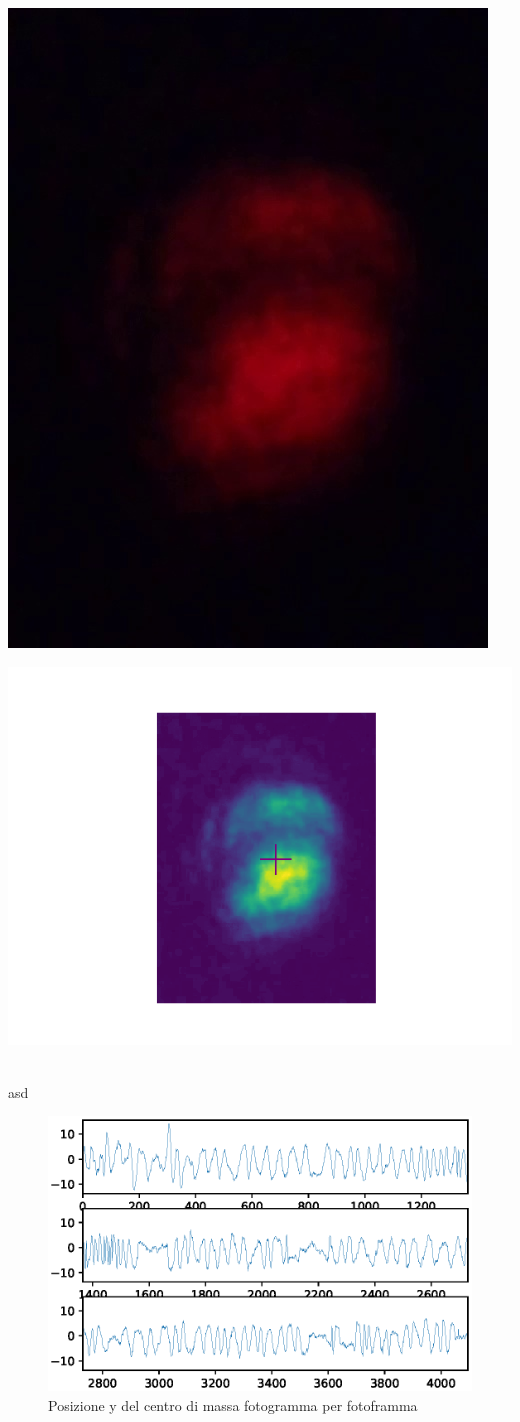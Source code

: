 \documentclass[10pt,a4paper]{article}
\begin{document}
	\begin{center}
		\begin{minipage}{.4\linewidth}
			\centering
			\includegraphics[width=0.43\linewidth]{dati/fotogrammi/500.jpg}
		\end{minipage}
		\rightarrow
		\begin{minipage}{.4\linewidth}
			\centering
			\includegraphics[width=\linewidth]{immagini/video/0500.png}
		\end{minipage}\\
	\caption{asd}
	\end{center}
	\begin{figure}[h]
		\centering
		\includegraphics[width=\linewidth]{immagini/centro_di_massa-x.eps}
		\caption{Posizione y del centro di massa fotogramma per fotoframma}
		\label{fig:cmy}
	\end{figure}
\end{document}
